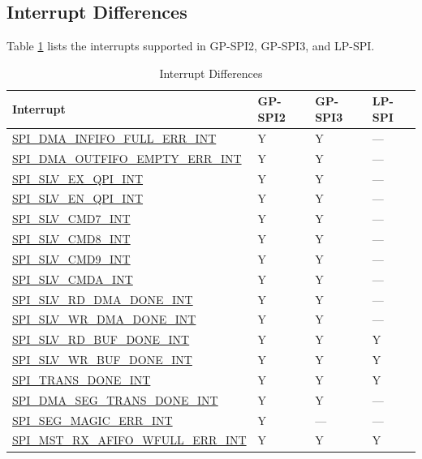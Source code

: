 \documentclass[main\_\_EN.tex]{subfiles}
\begin{document}
\subsection{Interrupt Differences}

Table \ref{tab:interrupt-differences} lists the interrupts supported in GP-SPI2, GP-SPI3, and LP-SPI.

\begin{longtable}{|p{7.5cm}|p{1.5cm}|p{1.5cm}|p{1.5cm}|}
\caption{Interrupt Differences}\label{tab:interrupt-differences}
\\
\hline
\rowcolor{lightgray}
\textbf{Interrupt} & \textbf{GP-SPI2} & \textbf{GP-SPI3}  & \textbf{LP-SPI} \\ \hline
\endhead
\hyperref[int:SPIINFIFOFULLERRINT]{SPI\_DMA\_INFIFO\_FULL\_ERR\_INT} &  Y  &  Y & ---  \\ \hline
\hyperref[int:SPIOUTFIFOEMPTYERRINT]{SPI\_DMA\_OUTFIFO\_EMPTY\_ERR\_INT} & Y &  Y & --- \\ \hline
\hyperref[int:SPISLVEXQPIINT]{SPI\_SLV\_EX\_QPI\_INT}& Y & Y & ---\\ \hline
\hyperref[int:SPISLVENQPIINT]{SPI\_SLV\_EN\_QPI\_INT} & Y & Y & --- \\ \hline
\hyperref[int:SPISLVCMD7INT]{SPI\_SLV\_CMD7\_INT} & Y & Y & ---\\ \hline
\hyperref[int:SPISLVCMD8INT]{SPI\_SLV\_CMD8\_INT}& Y & Y & ---\\ \hline
\hyperref[int:SPISLVCMD9INT]{SPI\_SLV\_CMD9\_INT} & Y & Y & --- \\ \hline
\hyperref[int:SPISLVCMDAINT]{SPI\_SLV\_CMDA\_INT} & Y & Y & --- \\ \hline
\hyperref[int:SPISLVRDDMADONEINT]{SPI\_SLV\_RD\_DMA\_DONE\_INT} & Y & Y & --- \\ \hline
\hyperref[int:SPISLVWRDMADONEINT]{SPI\_SLV\_WR\_DMA\_DONE\_INT} & Y & Y & ---\\ \hline
\hyperref[int:SPISLVRDBUFDONEINT]{SPI\_SLV\_RD\_BUF\_DONE\_INT} & Y & Y & Y \\ \hline
\hyperref[int:SPISLVWRBUFDONEINT]{SPI\_SLV\_WR\_BUF\_DONE\_INT} & Y & Y & Y \\ \hline
\hyperref[int:SPITRANSDONEINT]{SPI\_TRANS\_DONE\_INT} & Y & Y & Y \\ \hline
\hyperref[int:SPIDMASEGTRANSDONEINT]{SPI\_DMA\_SEG\_TRANS\_DONE\_INT} & Y & Y & ---\\ \hline
\hyperref[int:SPISEGMAGICERRINT]{SPI\_SEG\_MAGIC\_ERR\_INT} & Y & --- & --- \\ \hline
\hyperref[int:SPIMSTRXAFIFOWFULLERRINT]{SPI\_MST\_RX\_AFIFO\_WFULL\_ERR\_INT} & Y & Y & Y\\ \hline

\end{longtable}
\end{document}
